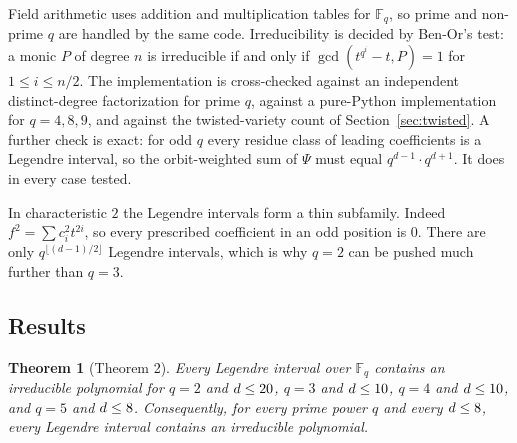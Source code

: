 \documentclass[11pt,a4paper]{article}
\newtheorem{theorem}{Theorem}[section]
\theoremstyle{definition}
\theoremstyle{remark}
\newcommand{\Fq}{\mathbb{F}_q}
\newcommand{\Nirr}{N_{\mathrm{irr}}}
\begin{document}
Field arithmetic uses addition and multiplication tables for $\Fq$, so prime and non-prime $q$
are handled by the same code. Irreducibility is decided by Ben-Or's test: a monic $P$ of degree $n$
is irreducible if and only if $\gcd(t^{q^i}-t,P)=1$ for $1\le i\le n/2$. The implementation is
cross-checked against an independent distinct-degree factorization for prime $q$, against a
pure-Python implementation for $q=4,8,9$, and against the twisted-variety count of
Section~\ref{sec:twisted}. A further check is exact: for odd $q$ every residue class of
leading coefficients is a Legendre interval, so the orbit-weighted sum of $\Psi$ must equal
$q^{d-1}\cdot q^{d+1}$. It does in every case tested.

In characteristic $2$ the Legendre intervals form a thin subfamily. Indeed $f^2=\sum c_i^2t^{2i}$,
so every prescribed coefficient in an odd position is $0$. There are only $q^{\lfloor(d-1)/2\rfloor}$
Legendre intervals, which is why $q=2$ can be pushed much further than $q=3$.

\subsection{Results}

\begin{table}[ht]
\centering\small

\caption{The open range. ``Intervals'' is the number of distinct Legendre intervals and
``orbits'' the number examined after the affine reduction; rows marked $^\dagger$ examine a random
sample of orbits. The ratio is $\min_f 2d\,\Nirr(f)/q^{d+1}$. The variance column is the mean
of $(\Psi(f)-q^{d+1})^2/q^{d+1}$ over all Legendre intervals. For odd $q$ it is to be compared with
the Keating--Rudnick limit $d-2$ \cite{KR2014}, valid for $d\ge4$; for $q=2,4$ the Legendre intervals
are a special subfamily and no prediction applies. Rows with $q\ge d-1$ other than $q=2$ are omitted,
since Theorem~1 covers them. Source: \texttt{data/open\_regime\_summary.csv}.}
\label{tab:open}
\end{table}

\begin{theorem}[Theorem 2]\label{thm:computed}
Every Legendre interval over $\Fq$ contains an irreducible polynomial for $q=2$ and $d\le20$,
$q=3$ and $d\le10$, $q=4$ and $d\le10$, and $q=5$ and $d\le8$. Consequently, for
every prime power $q$ and every $d\le8$, every Legendre interval contains an irreducible polynomial.
\end{theorem}
\end{document}

